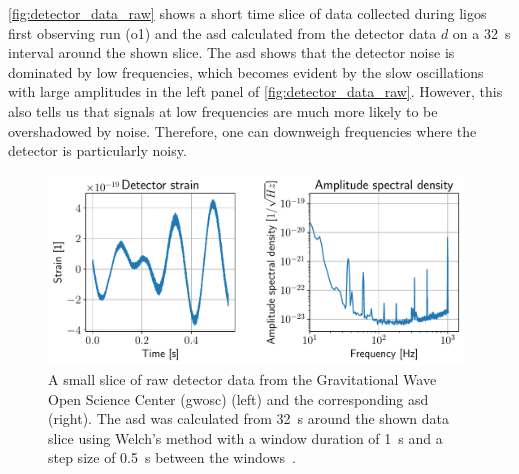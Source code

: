 \autoref{fig:detector_data_raw} shows a short time slice of data collected during \acrshort{ligo}s first observing run (\acrshort{o1}) and the \acrshort{asd} calculated from the detector data $d$ on a \SI{32}{\second} interval around the shown slice. The \acrshort{asd} shows that the detector noise is dominated by low frequencies, which becomes evident by the slow oscillations with large amplitudes in the left panel of \autoref{fig:detector_data_raw}. However, this also tells us that signals at low frequencies are much more likely to be overshadowed by noise. Therefore, one can downweigh frequencies where the detector is particularly noisy.

\begin{figure}
	\centering
	\includegraphics[width=0.98\textwidth]{chapters/foundations/sections/cbc_searches/images/data_raw.pdf}
	\caption[Raw detector data]{A small slice of raw detector data from the Gravitational Wave Open Science Center (\acrshort{gwosc}) (left) and the corresponding \acrshort{asd} (right). The \acrshort{asd} was calculated from \SI{32}{\second} around the shown data slice using Welch's method with a window duration of \SI{1}{\second} and a step size of \SI{0.5}{\second} between the windows~\cite{LIGOScientific:2019lzm}.}\label{fig:detector_data_raw}
\end{figure}

